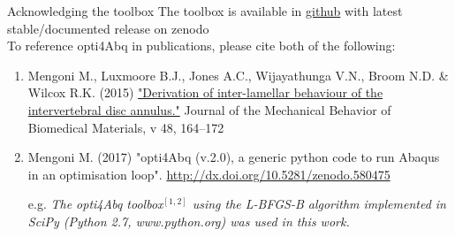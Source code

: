 \begin{frame}{Acknowledging the toolbox}
\vfill
The toolbox is available in \href{https://github.com/mengomarlene/opti4Abq}{github} with latest stable/documented release on zenodo\\[.5cm]
    
To reference opti4Abq in publications, please cite both of the following:
{\footnotesize
\begin{enumerate}
\item Mengoni M., Luxmoore B.J., Jones A.C., Wijayathunga V.N., Broom N.D. \& Wilcox R.K. (2015)
\href{http://dx.doi.org/10.1016/j.jmbbm.2015.03.028}{"Derivation of inter-lamellar behaviour of the intervertebral disc annulus."} Journal of the Mechanical Behavior of Biomedical Materials, v 48, 164–172

\item Mengoni M. (2017) "opti4Abq (v.2.0), a generic python code to run Abaqus in an optimisation loop". \url{http://dx.doi.org/10.5281/zenodo.580475}

\item[\color{black} e.g.]  {\it The opti4Abq toolbox$^{[1,2]}$ using the L-BFGS-B algorithm implemented in SciPy (Python 2.7, www.python.org) was used in this work.}
\end{enumerate}
}

\end{frame}